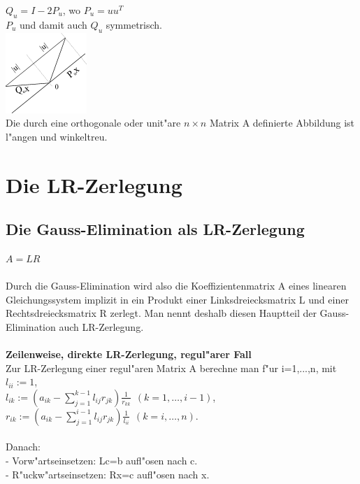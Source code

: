 \documentclass[10pt, a4paper, twocolumn]{scrartcl}
\begin{document}
$Q_u=I-2P_u$, wo $P_u=uu^T$\\

$P_u$ und damit auch $Q_u$ symmetrisch.\\

\includegraphics{pictures/householder.png}\\

Die durch eine orthogonale oder unit"are $n \times n$ Matrix A definierte Abbildung ist l"angen und winkeltreu.\\

\section{Die LR-Zerlegung}

\subsection{Die Gauss-Elimination als LR-Zerlegung}

$A=LR$\\\\

Durch die Gauss-Elimination wird also die Koeffizientenmatrix A eines linearen Gleichungssystem implizit in ein Produkt einer Linksdreiecksmatrix L und einer Rechtsdreiecksmatrix R zerlegt. Man nennt deshalb diesen Hauptteil der Gauss-Elimination auch LR-Zerlegung.\\\\

{\bf Zeilenweise, direkte LR-Zerlegung, regul"arer Fall}\\
Zur LR-Zerlegung einer regul"aren Matrix A berechne man f"ur i=1,...,n, mit $l_{ii}:=1$,\\
$l_{ik}:=(a_{ik}-\sum^{k-1}_{j=1}l_{ij}r_{jk})\frac{1}{r_{kk}}\:\: (k=1,\ldots,i-1)$,\\
$r_{ik}:=(a_{ik}-\sum^{i-1}_{j=1}l_{ij}r_{jk})\frac{1}{l_{ii}}\:\: (k=i,\ldots,n)$.\\\\

Danach:\\
- Vorw"artseinsetzen: Lc=b aufl"osen nach c.\\
- R"uckw"artseinsetzen: Rx=c aufl"osen nach x.\\\\
\end{document}
